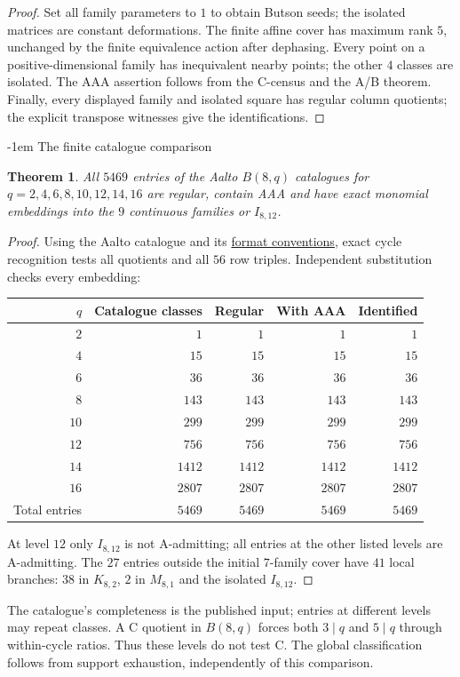 \documentclass[11pt,a4paper]{article}
\makeatletter
\newtheorem{theorem}{Theorem}[section]
\theoremstyle{plain}
\theoremstyle{definition}
\numberwithin{equation}{section}
\renewcommand\subsection{\@startsection{subsection}{2}{\z@}  {\medskipamount}  {-1em}  {\normalfont\normalsize\bfseries}}
\makeatother
\begin{document}
\begin{proof}
Set all family parameters to $1$ to obtain Butson seeds; the isolated matrices are constant deformations. The finite affine cover has maximum rank $5$, unchanged by the finite equivalence action after dephasing. Every point on a positive-dimensional family has inequivalent nearby points; the other $4$ classes are isolated. The AAA assertion follows from the C-census and the A/B theorem. Finally, every displayed family and isolated square has regular column quotients; the explicit transpose witnesses give the identifications.
\end{proof}

\subsection{The finite catalogue comparison}\label{sec:aalto}
\begin{theorem}\label{thm:catalogue}
All $5469$ entries of the Aalto $B(8,q)$ catalogues for $q=2,4,6,8,10,12,14,16$ are regular, contain AAA and have exact monomial embeddings into the $9$ continuous families or $I_{8,12}$.
\end{theorem}
\begin{proof}
Using the Aalto catalogue \cite{LOSz} and its {\hypersetup{allcolors=black}\href{https://wiki.aalto.fi/spaces/Butson/pages/122456122/}{format conventions}}, exact cycle recognition tests all quotients and all $56$ row triples. Independent substitution checks every embedding:
\begin{center}\begin{tabular}{rrrrr}\toprule $q$&Catalogue classes&Regular&With AAA&Identified\\\midrule
$2$&$1$&$1$&$1$&$1$\\
$4$&$15$&$15$&$15$&$15$\\
$6$&$36$&$36$&$36$&$36$\\
$8$&$143$&$143$&$143$&$143$\\
$10$&$299$&$299$&$299$&$299$\\
$12$&$756$&$756$&$756$&$756$\\
$14$&$1412$&$1412$&$1412$&$1412$\\
$16$&$2807$&$2807$&$2807$&$2807$\\
\midrule Total entries&$5469$&$5469$&$5469$&$5469$\\\bottomrule\end{tabular}\end{center}
At level $12$ only $I_{8,12}$ is not A-admitting; all entries at the other listed levels are A-admitting. The $27$ entries outside the initial $7$-family cover have $41$ local branches: $38$ in $K_{8,2}$, $2$ in $M_{8,1}$ and the isolated $I_{8,12}$.
\end{proof}
The catalogue's completeness is the published input; entries at different levels may repeat classes. A C quotient in $B(8,q)$ forces both $3\mid q$ and $5\mid q$ through within-cycle ratios. Thus these levels do not test C. The global classification follows from support exhaustion, independently of this comparison.
\end{document}
